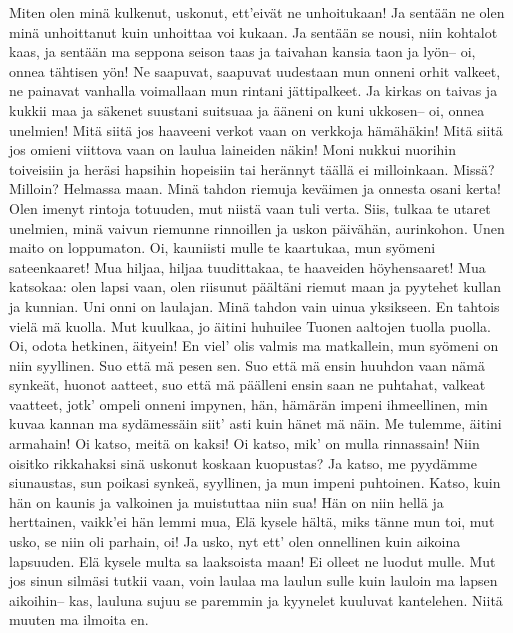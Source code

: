   \beginverse
    Miten olen minä kulkenut, uskonut,
    ett'eivät ne unhoitukaan!
    Ja sentään ne olen minä unhoittanut
    kuin unhoittaa voi kukaan.
    Ja sentään se nousi, niin kohtalot kaas,
    ja sentään ma seppona seison taas
    ja taivahan kansia taon ja lyön--
    oi, onnea tähtisen yön!
  \endverse
  \beginverse
    Ne saapuvat, saapuvat uudestaan
    mun onneni orhit valkeet,
    ne painavat vanhalla voimallaan
    mun rintani jättipalkeet.
    Ja kirkas on taivas ja kukkii maa
    ja säkenet suustani suitsuaa
    ja ääneni on kuni ukkosen--
    oi, onnea unelmien!
  \endverse
  \beginverse
    Mitä siitä jos haaveeni verkot vaan
    on verkkoja hämähäkin!
    Mitä siitä jos omieni viittova vaan
    on laulua laineiden näkin!
    Moni nukkui nuorihin toiveisiin
    ja heräsi hapsihin hopeisiin
    tai herännyt täällä ei milloinkaan.
    Missä? Milloin? Helmassa maan.
    Minä tahdon riemuja keväimen
    ja onnesta osani kerta!
    Olen imenyt rintoja totuuden,
    mut niistä vaan tuli verta.
    Siis, tulkaa te utaret unelmien,
    minä vaivun riemunne rinnoillen
    ja uskon päivähän, aurinkohon.
    Unen maito on loppumaton.
  \endverse
  \beginverse
    Oi, kauniisti mulle te kaartukaa,
    mun syömeni sateenkaaret!
    Mua hiljaa, hiljaa tuudittakaa,
    te haaveiden höyhensaaret!
    Mua katsokaa: olen lapsi vaan,
    olen riisunut päältäni riemut maan
    ja pyytehet kullan ja kunnian.
    Uni onni on laulajan.
  \endverse
  \beginverse
    Minä tahdon vain uinua yksikseen.
    En tahtois vielä mä kuolla.
    Mut kuulkaa, jo äitini huhuilee
    Tuonen aaltojen tuolla puolla.
    Oi, odota hetkinen, äityein!
    En viel' olis valmis ma matkallein,
    mun syömeni on niin syyllinen.
    Suo että mä pesen sen.
  \endverse
  \beginverse
    Suo että mä ensin huuhdon vaan
    nämä synkeät, huonot aatteet,
    suo että mä päälleni ensin saan
    ne puhtahat, valkeat vaatteet,
    jotk' ompeli onneni impynen,
    hän, hämärän impeni ihmeellinen,
    min kuvaa kannan ma sydämessäin
    siit' asti kuin hänet mä näin.
  \endverse
  \beginverse
    Me tulemme, äitini armahain!
    Oi katso, meitä on kaksi!
    Oi katso, mik' on mulla rinnassain!
    Niin oisitko rikkahaksi
    sinä uskonut koskaan kuopustas?
    Ja katso, me pyydämme siunaustas,
    sun poikasi synkeä, syyllinen,
    ja mun impeni puhtoinen.
  \endverse
  \beginverse
    Katso, kuin hän on kaunis ja valkoinen
    ja muistuttaa niin sua!
    Hän on niin hellä ja herttainen,
    vaikk'ei hän lemmi mua,
    Elä kysele hältä, miks tänne mun toi,
    mut usko, se niin oli parhain, oi!
    Ja usko, nyt ett' olen onnellinen
    kuin aikoina lapsuuden.
  \endverse
  \beginverse
    Elä kysele multa sa laaksoista maan!
    Ei olleet ne luodut mulle.
    Mut jos sinun silmäsi tutkii vaan,
    voin laulaa ma laulun sulle
    kuin lauloin ma lapsen aikoihin--
    kas, lauluna sujuu se paremmin
    ja kyynelet kuuluvat kantelehen.
    Niitä muuten ma ilmoita en.
  \endverse
\endsong


